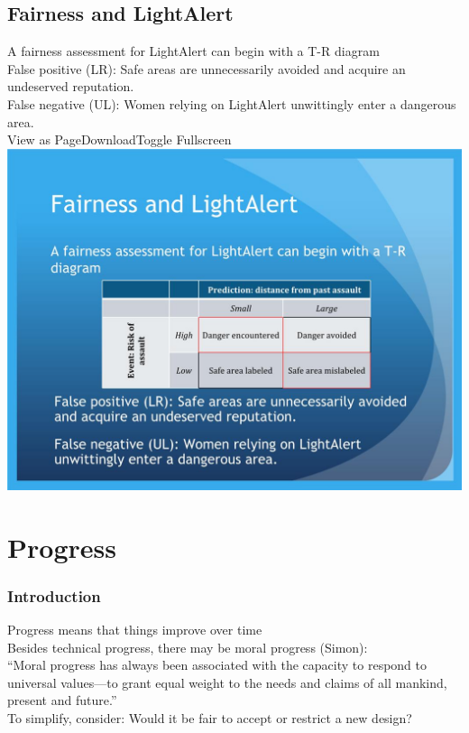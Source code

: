 \documentclass{article}
\begin{document}
\subsection*{Fairness and LightAlert}
\label{sub:fairness_and_lightalert}
A fairness assessment for LightAlert can begin with a T-R diagram\\
False positive (LR): Safe areas are unnecessarily avoided and acquire an undeserved reputation.\\
False negative (UL): Women relying on LightAlert unwittingly enter a dangerous area.\\
View as PageDownloadToggle Fullscreen\\
\includegraphics[scale=0.5]{errorandfairness.jpg}


\section*{Progress}
\label{sec:progress}
\subsubsection*{Introduction}
\label{ssub:introduction}
Progress means that things improve over time\\
Besides technical progress, there may be moral progress (Simon):\\
“Moral progress has always been associated with the capacity to respond to universal values—to grant equal weight to the needs and claims of all mankind, present and future.”\\
To simplify, consider: Would it be fair to accept or restrict a new design?\\
\end{document}
